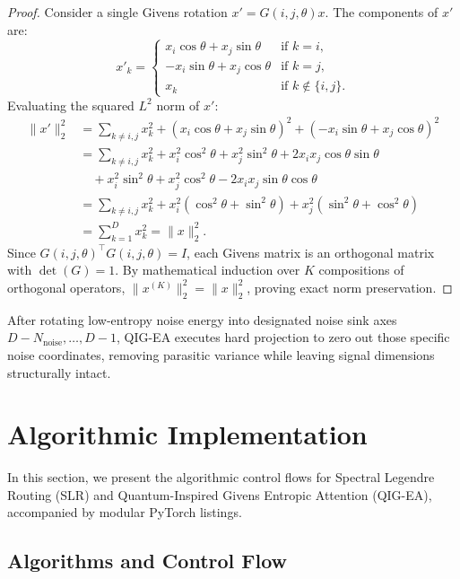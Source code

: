 \documentclass{article}
\newcommand{\slr}{\textsc{SLR}\xspace}
\newcommand{\qigea}{\textsc{QIG-EA}\xspace}
\begin{document}
\begin{proof}
Consider a single Givens rotation $x' = G(i, j, \theta) x$. The components of $x'$ are:
\begin{equation}
  x'_k = \begin{cases}
    x_i \cos\theta + x_j \sin\theta & \text{if } k = i, \\
    -x_i \sin\theta + x_j \cos\theta & \text{if } k = j, \\
    x_k & \text{if } k \notin \{i, j\}.
  \end{cases}
\end{equation}
Evaluating the squared $L^2$ norm of $x'$:
\begin{align}
  \|x'\|_2^2 &= \sum_{k \neq i, j} x_k^2 + (x_i \cos\theta + x_j \sin\theta)^2 + (-x_i \sin\theta + x_j \cos\theta)^2 \\
  &= \sum_{k \neq i, j} x_k^2 + x_i^2 \cos^2\theta + x_j^2 \sin^2\theta + 2 x_i x_j \cos\theta \sin\theta \\
  &\quad + x_i^2 \sin^2\theta + x_j^2 \cos^2\theta - 2 x_i x_j \sin\theta \cos\theta \\
  &= \sum_{k \neq i, j} x_k^2 + x_i^2 (\cos^2\theta + \sin^2\theta) + x_j^2 (\sin^2\theta + \cos^2\theta) \\
  &= \sum_{k=1}^D x_k^2 = \|x\|_2^2.
\end{align}
Since $G(i, j, \theta)^\top G(i, j, \theta) = I$, each Givens matrix is an orthogonal matrix with $\det(G) = 1$. By mathematical induction over $K$ compositions of orthogonal operators, $\|x^{(K)}\|_2^2 = \|x\|_2^2$, proving exact norm preservation.
\end{proof}

After rotating low-entropy noise energy into designated noise sink axes $D - N_{\text{noise}}, \dots, D - 1$, \qigea executes hard projection to zero out those specific noise coordinates, removing parasitic variance while leaving signal dimensions structurally intact.

\section{Algorithmic Implementation}
\label{sec:algorithmic_implementation}

In this section, we present the algorithmic control flows for Spectral Legendre Routing (\slr) and Quantum-Inspired Givens Entropic Attention (\qigea), accompanied by modular PyTorch listings.

\subsection{Algorithms and Control Flow}
\end{document}
